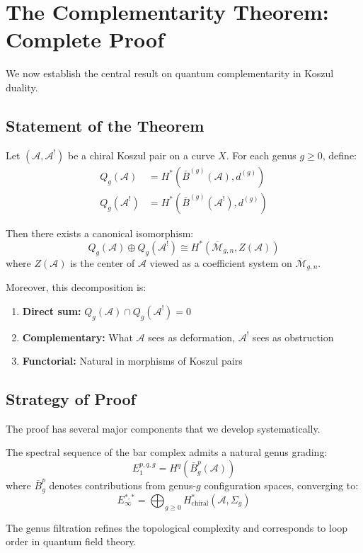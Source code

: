 \section{The Complementarity Theorem: Complete Proof}
\label{sec:complementarity-theorem}

We now establish the central result on quantum complementarity in Koszul duality.

\subsection{Statement of the Theorem}

\begin{theorem}
\label{thm:quantum-complementarity-main}
Let $(\mathcal{A}, \mathcal{A}^!)$ be a chiral Koszul pair on a curve $X$. For each genus $g \geq 0$, define:
\begin{align}
Q_g(\mathcal{A}) &= H^*(\bar{B}^{(g)}(\mathcal{A}), d^{(g)})\\
Q_g(\mathcal{A}^!) &= H^*(\bar{B}^{(g)}(\mathcal{A}^!), d^{(g)})
\end{align}

Then there exists a canonical isomorphism:
\begin{equation}
Q_g(\mathcal{A}) \oplus Q_g(\mathcal{A}^!) \cong H^*(\overline{\mathcal{M}}_{g,n}, Z(\mathcal{A}))
\end{equation}
where $Z(\mathcal{A})$ is the center of $\mathcal{A}$ viewed as a coefficient system on $\overline{\mathcal{M}}_{g,n}$.

Moreover, this decomposition is:
\begin{enumerate}
\item \textbf{Direct sum:} $Q_g(\mathcal{A}) \cap Q_g(\mathcal{A}^!) = 0$
\item \textbf{Complementary:} What $\mathcal{A}$ sees as deformation, $\mathcal{A}^!$ sees as obstruction
\item \textbf{Functorial:} Natural in morphisms of Koszul pairs
\end{enumerate}
\end{theorem}

\subsection{Strategy of Proof}

The proof has several major components that we develop systematically.

\begin{theorem}\label{thm:ss-genus-stratification}
The spectral sequence of the bar complex admits a natural genus grading:
$$E_1^{p,q,g} = H^q\left(\bar{B}^p_g(\mathcal{A})\right)$$
where $\bar{B}^p_g$ denotes contributions from genus-$g$ configuration spaces, converging to:
$$E_\infty^{*,*} = \bigoplus_{g \geq 0} H^*_{\text{chiral}}(\mathcal{A}, \Sigma_g)$$

The genus filtration refines the topological complexity and corresponds to loop order 
in quantum field theory.
\end{theorem}

